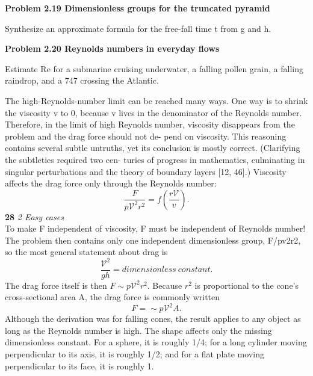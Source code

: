 \documentclass[a4paper, 12pt]{book}
\begin{document}
\colorbox{light-gray}{
\begin{minipage}{\textwidth}
\small{\textbf {Problem 2.19 Dimensionless groups for the truncated pyramid}

Synthesize an approximate formula for the free-fall time t from g and h.

\textbf {Problem 2.20 Reynolds numbers in everyday flows}

Estimate Re for a submarine cruising underwater, a falling pollen grain, a falling raindrop, and a 747 crossing the Atlantic.}

\end{minipage}
}
The high-Reynolds-number limit can be reached many ways. One way is to shrink the viscosity v to 0, because v lives in the denominator of the Reynolds number. Therefore, in the limit of high Reynolds number, viscosity disappears from the problem and the drag force should not de- pend on viscosity. This reasoning contains several subtle untruths, yet its conclusion is mostly correct. (Clarifying the subtleties required two cen- turies of progress in mathematics, culminating in singular perturbations and the theory of boundary layers [12, 46].)
Viscosity affects the drag force only through the Reynolds number:
\begin{equation}\frac{F}{p\mathcal{V}^2r^2}=f\left(\frac{r\mathcal{V}}{v}\right).\end{equation}
\newpage
\large\textbf{28} \hfill \textit{2 Easy cases} \\
To make F independent of viscosity, F must be independent of Reynolds number! The problem then contains only one independent dimensionless group, F/pv2r2, so the most general statement about drag is
\begin{equation}\frac{\mathcal{V}^2}{gh}=dimensionless \ constant.\end{equation} 
The drag force itself is then $F \sim p\mathcal{V}^2r^2$. Because $r^2$ is proportional to the cone’s cross-sectional area A, the drag force is commonly written
\begin{equation}F=\sim p\mathcal{V}^2A.\end{equation} 
Although the derivation was for falling cones, the result applies to any object as long as the Reynolds number is high. The shape affects only the missing dimensionless constant. For a sphere, it is roughly 1/4; for a long cylinder moving perpendicular to its axis, it is roughly 1/2; and for a flat plate moving perpendicular to its face, it is roughly 1.
\end{document}

